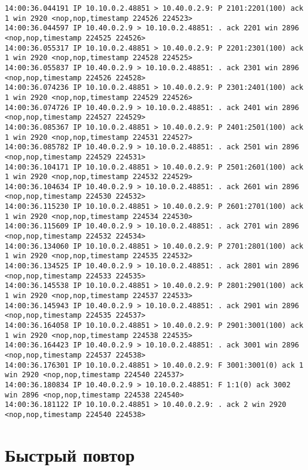 \documentclass[a4paper,12pt]{article}
\begin{document}
\begin{lstlisting}
14:00:36.044191 IP 10.10.0.2.48851 > 10.40.0.2.9: P 2101:2201(100) ack 1 win 2920 <nop,nop,timestamp 224526 224523>
14:00:36.044597 IP 10.40.0.2.9 > 10.10.0.2.48851: . ack 2201 win 2896 <nop,nop,timestamp 224525 224526>
14:00:36.055317 IP 10.10.0.2.48851 > 10.40.0.2.9: P 2201:2301(100) ack 1 win 2920 <nop,nop,timestamp 224528 224525>
14:00:36.055837 IP 10.40.0.2.9 > 10.10.0.2.48851: . ack 2301 win 2896 <nop,nop,timestamp 224526 224528>
14:00:36.074236 IP 10.10.0.2.48851 > 10.40.0.2.9: P 2301:2401(100) ack 1 win 2920 <nop,nop,timestamp 224529 224526>
14:00:36.074726 IP 10.40.0.2.9 > 10.10.0.2.48851: . ack 2401 win 2896 <nop,nop,timestamp 224527 224529>
14:00:36.085367 IP 10.10.0.2.48851 > 10.40.0.2.9: P 2401:2501(100) ack 1 win 2920 <nop,nop,timestamp 224531 224527>
14:00:36.085782 IP 10.40.0.2.9 > 10.10.0.2.48851: . ack 2501 win 2896 <nop,nop,timestamp 224529 224531>
14:00:36.104171 IP 10.10.0.2.48851 > 10.40.0.2.9: P 2501:2601(100) ack 1 win 2920 <nop,nop,timestamp 224532 224529>
14:00:36.104634 IP 10.40.0.2.9 > 10.10.0.2.48851: . ack 2601 win 2896 <nop,nop,timestamp 224530 224532>
14:00:36.115230 IP 10.10.0.2.48851 > 10.40.0.2.9: P 2601:2701(100) ack 1 win 2920 <nop,nop,timestamp 224534 224530>
14:00:36.115609 IP 10.40.0.2.9 > 10.10.0.2.48851: . ack 2701 win 2896 <nop,nop,timestamp 224532 224534>
14:00:36.134060 IP 10.10.0.2.48851 > 10.40.0.2.9: P 2701:2801(100) ack 1 win 2920 <nop,nop,timestamp 224535 224532>
14:00:36.134525 IP 10.40.0.2.9 > 10.10.0.2.48851: . ack 2801 win 2896 <nop,nop,timestamp 224533 224535>
14:00:36.145538 IP 10.10.0.2.48851 > 10.40.0.2.9: P 2801:2901(100) ack 1 win 2920 <nop,nop,timestamp 224537 224533>
14:00:36.145943 IP 10.40.0.2.9 > 10.10.0.2.48851: . ack 2901 win 2896 <nop,nop,timestamp 224535 224537>
14:00:36.164058 IP 10.10.0.2.48851 > 10.40.0.2.9: P 2901:3001(100) ack 1 win 2920 <nop,nop,timestamp 224538 224535>
14:00:36.164423 IP 10.40.0.2.9 > 10.10.0.2.48851: . ack 3001 win 2896 <nop,nop,timestamp 224537 224538>
14:00:36.176301 IP 10.10.0.2.48851 > 10.40.0.2.9: F 3001:3001(0) ack 1 win 2920 <nop,nop,timestamp 224540 224537>
14:00:36.180834 IP 10.40.0.2.9 > 10.10.0.2.48851: F 1:1(0) ack 3002 win 2896 <nop,nop,timestamp 224538 224540>
14:00:36.181122 IP 10.10.0.2.48851 > 10.40.0.2.9: . ack 2 win 2920 <nop,nop,timestamp 224540 224538>
\end{lstlisting}

\section{Быстрый повтор}
\end{document}
